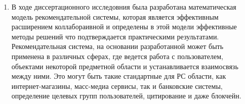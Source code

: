 \documentclass[a4paper,11pt]{proc}
\begin{document}
{\begin{enumerate}
	\item В ходе диссертационного исследовния была разработана
		математическая модель рекомендательной системы, которая
		является эффективным расширением коллабораивной и определены
		в этой модели эффективные методы решений что подтверждается
		практическими результатами. Рекомендательная система, на основании
		разработанной может быть применена в различных сферах, где
		ведется работа с пользователем, объектами некоторой предметной области
		и устанавливается взаимосвязь между ними. Это могут быть такие
		стандартные для РС области, как интернет-магазины, масс-медиа сервисы,
		так и банковские системы, определение целевых групп пользователей,
		цитирование и даже блокчейн.
\end{enumerate}
}
\end{document}

